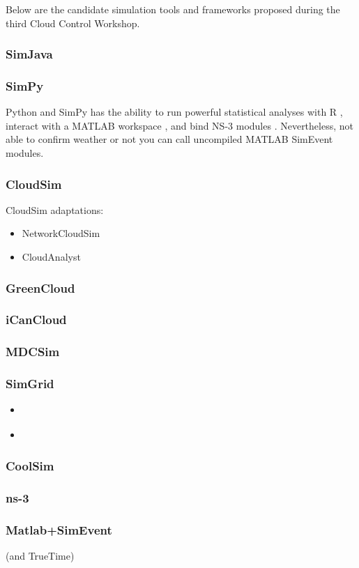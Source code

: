 Below are the candidate simulation tools and frameworks proposed during the third Cloud Control Workshop. \cite{zhao2012modeling}

\subsubsection{SimJava}


\subsubsection{SimPy}
Python and SimPy has the ability to run powerful statistical analyses with R \cite{rproject}, interact with a MATLAB workspace \cite{pymatlab}, and bind NS-3 modules \cite{ns3python}. Nevertheless, not able to confirm weather or not you can call uncompiled MATLAB SimEvent modules.

\subsubsection{CloudSim} \cite{cloudsim}

CloudSim adaptations:
\begin{itemize}
\item NetworkCloudSim \cite{6123487}
\item CloudAnalyst \cite{wickremasinghe2010cloudanalyst}
\end{itemize}

\subsubsection{GreenCloud}
\cite{greencloud}

\subsubsection{iCanCloud}
\cite{icancloud}

\subsubsection{MDCSim}
\cite{5289159}

\subsubsection{SimGrid} 
\cite{simgrid}

\begin{itemize}
\item \cite{4488918}
\item \cite{bobelin2012scalable}
\end{itemize}

\subsubsection{CoolSim}
\cite{coolsim}

\subsubsection{ns-3}
\cite{ns3}

\subsubsection{Matlab+SimEvent} (and TrueTime)